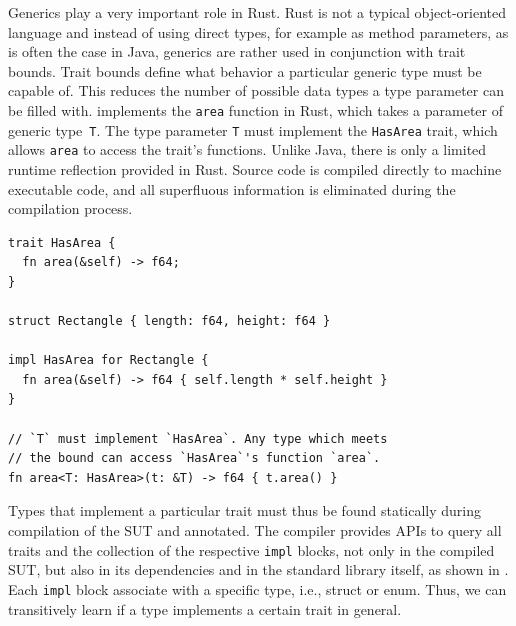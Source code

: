 \documentclass[paper=a4,%
  twoside,%
  BCOR4mm,%
  abstract=true,%
  toc=bibliography,%
  chapterprefix=true,%
  toc=bibliographynumbered,%
  open=right,%
  english,%
  pagesize=pdftex]{scrreprt}
\begin{document}
%
%
%


Generics play a very important role in Rust. Rust is not a typical object-oriented language and instead of using direct types, for example as method parameters, as is often the case in Java, generics are rather used in conjunction with trait bounds. Trait bounds define what behavior a particular generic type must be capable of. This reduces the number of possible data types a type parameter can be filled with.  implements the \texttt{area} function in Rust, which takes a parameter of generic type~\texttt{T}. The type parameter \texttt{T} must implement the \texttt{HasArea} trait, which allows \texttt{area} to access the trait's functions. Unlike Java, there is only a limited runtime reflection provided in Rust. Source code is compiled directly to machine executable code, and all superfluous information is eliminated during the compilation process.

\begin{lstlisting}[style=boxed, caption={A function that takes a generic types and specifies a bound}, label=lst:trait-bounds-example]
trait HasArea {
  fn area(&self) -> f64;
}

struct Rectangle { length: f64, height: f64 }

impl HasArea for Rectangle {
  fn area(&self) -> f64 { self.length * self.height }
}

// `T` must implement `HasArea`. Any type which meets
// the bound can access `HasArea`'s function `area`.
fn area<T: HasArea>(t: &T) -> f64 { t.area() }
\end{lstlisting}

Types that implement a particular trait must thus be found statically during compilation of the \ac{SUT} and annotated. The compiler provides \acp{API} to query all traits and the collection of the respective \texttt{impl} blocks, not only in the compiled \ac{SUT}, but also in its dependencies and in the standard library itself, as shown in . Each \texttt{impl} block associate with a specific type, i.e., struct or enum. Thus, we can transitively learn if a type implements a certain trait in general. 
\end{document}
